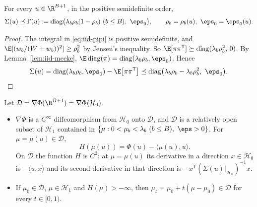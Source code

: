 \begin{lemma}\label{lem:iid-domination}
For every $u\in\R^{B+1}$, in the positive semidefinite order,
\[
\Sigma(u)\preceq\Gamma(u):=\operatorname{diag}\bigl(\lambda_b\rho_b(1-\rho_b)\ (b\le B),\
\eps_0\bigr),\qquad\rho_b=\rho_b(u),\ \eps_0=\eps_0(u).
\]
\end{lemma}

\begin{proof}
The integral in \eqref{eq:iid-pipi} is positive semidefinite, and
$\E[(w_b/(W+w_b))^2]\ge\rho_b^2$ by Jensen's inequality. So
$\E[\pi\pi^{\mathsf T}]\succeq\operatorname{diag}(\lambda_b\rho_b^2,\,0)$. By
Lemma~\ref{lem:iid-mecke},
$\E\operatorname{diag}(\pi)=\operatorname{diag}(\lambda_b\rho_b,\eps_0)$. Hence
\[
\Sigma(u)=\operatorname{diag}(\lambda_b\rho_b,\eps_0)-\E\bigl[\pi\pi^{\mathsf T}\bigr]
\preceq\operatorname{diag}\bigl(\lambda_b\rho_b-\lambda_b\rho_b^2,\ \eps_0\bigr).\qedhere
\]
\end{proof}

\begin{lemma}\label{lem:iid-legendre}
Let $\mathcal{D}=\nabla\Phi(\R^{B+1})=\nabla\Phi(\mathcal{H}_0)$.
\begin{itemize}
\item[(i)] $\nabla\Phi$ is a $C^\infty$ diffeomorphism from $\mathcal{H}_0$ onto
$\mathcal{D}$, and $\mathcal{D}$ is a relatively open subset of $\mathcal{H}_1$ contained
in $\{\mu:0<\mu_b<\lambda_b\ (b\le B),\ \eps>0\}$. For $\mu=\mu(u)\in\mathcal{D}$,
\[
H(\mu(u))=\Phi(u)-\langle\mu(u),u\rangle .
\]
On $\mathcal{D}$ the function $H$ is $C^2$; at $\mu=\mu(u)$ its derivative in a direction
$x\in\mathcal{H}_0$ is $-\langle u,x\rangle$ and its second derivative in that direction is
$-x^{\mathsf T}(\Sigma(u)|_{\mathcal{H}_0})^{-1}x$.
\item[(ii)] If $\mu_0\in\mathcal{D}$, $\mu\in\mathcal{H}_1$ and $H(\mu)>-\infty$, then
$\mu_t=\mu_0+t(\mu-\mu_0)\in\mathcal{D}$ for every $t\in[0,1)$.
\end{itemize}
\end{lemma}

